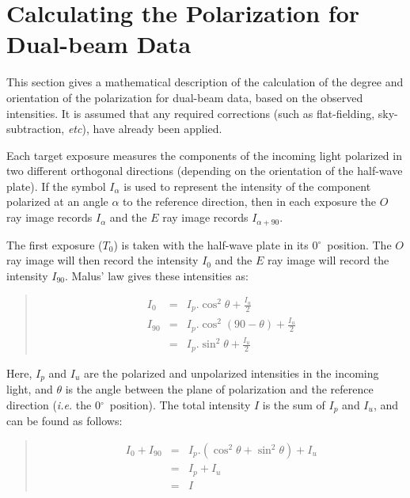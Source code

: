 \documentclass[twoside,11pt]{starlink}
\newenvironment{myquote}{\begin{quote}\begin{small}}{\end{small}\end{quote}}
\providecommand{\dgs}{\hbox{$^\circ$}}
\begin{document}
\newpage

\section{\label{APP:POL}Calculating the Polarization for Dual-beam Data}
This section gives a mathematical description of the calculation of the
degree and orientation of the polarization for dual-beam data, based on
the observed intensities. It is assumed that any required corrections
(such as flat-fielding, sky-subtraction, \emph{etc}), have already been
applied.

Each target exposure measures the components of the incoming light
polarized in two different orthogonal directions (depending on the
orientation of the half-wave plate). If the symbol $I_{\alpha}$ is used
to represent the intensity of the component polarized at an angle
$\alpha$ to the reference direction, then in each exposure the $O$ ray
image records $I_{\alpha}$ and the $E$ ray image records $I_{\alpha+90}$.

The first exposure ($T_{0}$) is taken with the half-wave plate in its 0\dgs\
position. The $O$ ray image will then record the intensity $I_{0}$ and
the $E$ ray image will record the intensity $I_{90}$. Malus' law gives
these intensities as:

\begin{myquote}
\begin{eqnarray*}
  I_{0} & = & I_{p}.\cos^{2}\theta + \frac{I_{u}}{2} \\
 I_{90} & = & I_{p}.\cos^{2}(90 - \theta) + \frac{I_{u}}{2} \\
        & = & I_{p}.\sin^{2}\theta + \frac{I_{u}}{2}
\end{eqnarray*}
\end{myquote}

Here, $I_{p}$ and $I_{u}$ are the polarized and unpolarized intensities
in the incoming light, and $\theta$ is the angle between the plane of
polarization and the reference direction (\emph{i.e.} the 0\dgs\ position). The
total intensity $I$ is the sum of $I_{p}$ and $I_{u}$, and can be found
as follows:
\begin{myquote}
\begin{eqnarray*}
  I_{0} + I_{90} & = & I_{p}.(\cos^{2}\theta + \sin^{2}\theta) + I_{u} \\
                 & = & I_{p} + I_{u} \\
                 & = & I
\end{eqnarray*}
\end{myquote}
\end{document}
